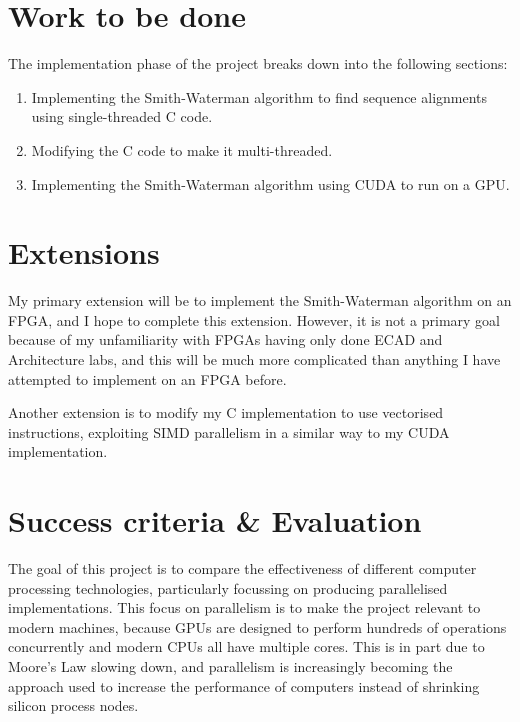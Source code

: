 \section*{Work to be done}

The implementation phase of the project breaks down into the following sections:

\begin{enumerate}

\item Implementing the Smith-Waterman algorithm to find sequence alignments using single-threaded C code.

\item Modifying the C code to make it multi-threaded.

\item Implementing the Smith-Waterman algorithm using CUDA to run on a GPU.

\end{enumerate}

\section*{Extensions}

My primary extension will be to implement the Smith-Waterman algorithm on an FPGA, and I hope to complete this extension.
However, it is not a primary goal because of my unfamiliarity with FPGAs having only done ECAD and Architecture labs, and this will be much more complicated than anything I have attempted to implement on an FPGA before.

Another extension is to modify my C implementation to use vectorised instructions, exploiting SIMD parallelism in a similar way to my CUDA implementation.

\section*{Success criteria \& Evaluation}

The goal of this project is to compare the effectiveness of different computer processing technologies, particularly focussing on producing parallelised implementations.
This focus on parallelism is to make the project relevant to modern machines, because GPUs are designed to perform hundreds of operations concurrently and modern CPUs all have multiple cores.
This is in part due to Moore's Law slowing down, and parallelism is increasingly becoming the approach used to increase the performance of computers instead of shrinking silicon process nodes.


